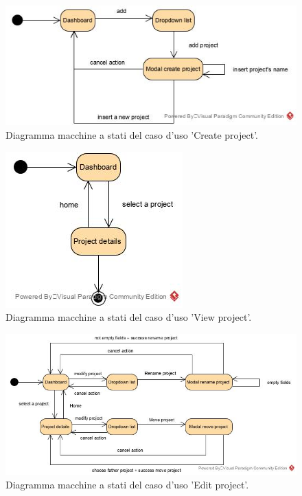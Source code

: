 \begin{figure}[H]
	\centering
	\caption{Diagramma macchine a stati del caso d'uso 'Create project'.}
	\label{fig:diagramma-macchine-stati:create-project}
	\includegraphics[width=\textwidth]{images/diagramma-macchine-stati/create-project}
\end{figure}

\begin{figure}[H]
	\centering
	\caption{Diagramma macchine a stati del caso d'uso 'View project'.}
	\label{fig:diagramma-macchine-stati:view-project}
	\includegraphics[width=\textwidth]{images/diagramma-macchine-stati/view-project}
\end{figure}


\begin{figure}[H]
	\centering
	\caption{Diagramma macchine a stati del caso d'uso 'Edit project'.}
	\label{fig:diagramma-macchine-stati:edit-project}
	\includegraphics[width=\textwidth]{images/diagramma-macchine-stati/edit-project}
\end{figure}

